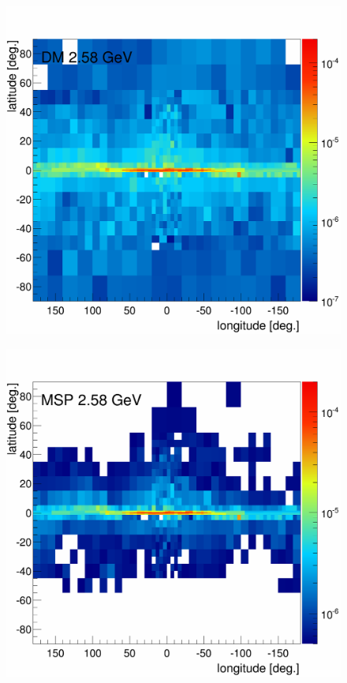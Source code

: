 \begin{figure}[h]
\begin{minipage}[h]{0.45\textwidth}
  \end{minipage}
  \hfill
  \begin{minipage}[h]{0.45\textwidth}
  	\centering
	\includegraphics[width=1\linewidth]{pic/results/DMonly_DM_fluxE12_skymap.png}
  	\label{fig:DMonly_skymap_DM}
  \end{minipage}
  \hfill
  \begin{minipage}[h]{0.45\textwidth}
  	\centering
	\includegraphics[width=1\linewidth]{pic/results/MSPonly_MSP_fluxE12_skymap.png}
  	\label{fig:MSPonly_skymap_MSP}
  \end{minipage}
  \caption{}
  \label{fig:Excess_comp_flux_comparison}
\end{figure}


